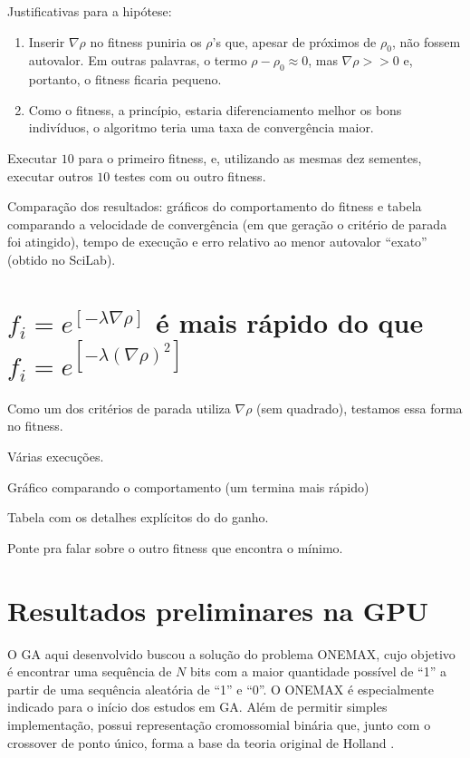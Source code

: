 	Justificativas para a hipótese: 
	
	\begin{enumerate}
		\item Inserir $\nabla \rho$ no fitness puniria os $\rho$'s que, apesar de próximos de $\rho_0$, não fossem autovalor. Em outras palavras, o termo $\rho - \rho_0 \approx 0$, mas $\nabla \rho >> 0$ e, portanto, o fitness ficaria pequeno.
		
		\item Como o fitness, a princípio, estaria diferenciamento melhor os bons indivíduos, o algoritmo teria uma taxa de convergência maior.
		
	\end{enumerate}
	
		Executar $10$ para o primeiro fitness, e, utilizando as mesmas dez sementes, executar outros $10$ testes com ou outro fitness.
		
		Comparação dos resultados: gráficos do comportamento do fitness e tabela comparando a velocidade de convergência (em que geração o critério de parada foi atingido), tempo de execução e erro relativo ao menor autovalor ``exato'' (obtido no SciLab).

	\section{$f_i = e^{[-\lambda \nabla \rho]}$ é mais rápido do que $f_i = e^{[-\lambda (\nabla \rho)^2]}$}
	
	Como um dos critérios de parada utiliza $\nabla \rho$ (sem quadrado), testamos essa forma no fitness.
	
	Várias execuções.
	
	Gráfico comparando o comportamento (um termina mais rápido)
	
	Tabela com os detalhes explícitos do do ganho.
	
	Ponte pra falar sobre o outro fitness que encontra o mínimo.
	
	\section{Resultados preliminares na GPU}\label{sec:oneMaxNaGPU}
	
		O GA aqui desenvolvido buscou a solução do problema ONEMAX, cujo objetivo é encontrar uma sequência de $N$ bits com a maior quantidade possível de “1” a partir de uma sequência aleatória de “1” e “0”. O ONEMAX é especialmente indicado para o início dos estudos em GA. Além de permitir simples implementação, possui representação cromossomial binária que, junto com o crossover de ponto único, forma a base da teoria original de Holland \cite{Linden2008}.

